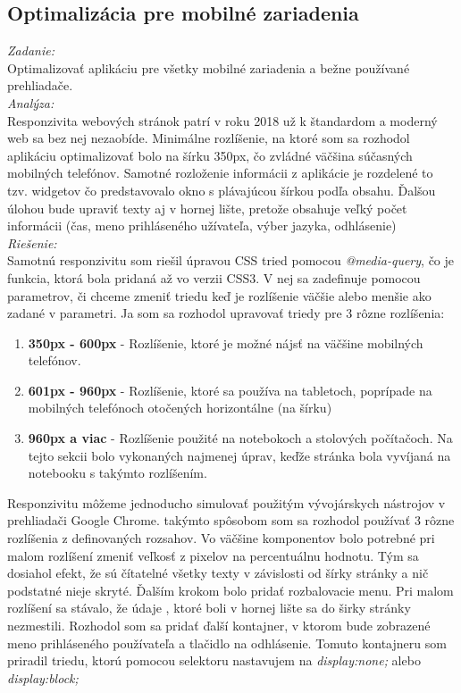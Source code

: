 \documentclass[11pt, oneside]{report}
\begin{document}
\subsection{Optimalizácia pre mobilné zariadenia}
\textit{Zadanie:}\\
Optimalizovať aplikáciu pre všetky mobilné zariadenia a bežne používané prehliadače.
\\\textit{Analýza:}\\
Responzivita webových stránok patrí v roku 2018 už k štandardom a moderný web sa bez nej nezaobíde. Minimálne rozlíšenie, na ktoré som sa rozhodol aplikáciu optimalizovať  bolo na šírku  350px, čo zvládné väčšina súčasných mobilných telefónov.  Samotné rozloženie  informácii z aplikácie je rozdelené to tzv. widgetov čo predstavovalo okno s plávajúcou šírkou podľa obsahu. Ďalšou úlohou bude upraviť  texty aj v hornej lište, pretože obsahuje veľký počet informácii (čas, meno prihláseného užívateľa, výber jazyka, odhlásenie)
\\\textit{Riešenie:}\\
Samotnú responzivitu som riešil  úpravou CSS tried pomocou \textit{@media-query}, čo je funkcia, ktorá bola pridaná až vo verzii CSS3. V nej sa zadefinuje pomocou parametrov, či chceme zmeniť triedu keď je rozlíšenie väčšie alebo menšie ako zadané v parametri. Ja som sa rozhodol upravovať triedy pre 3 rôzne rozlíšenia:
\begin{enumerate}
\item \textbf{350px - 600px} - Rozlíšenie, ktoré je možné nájsť na väčšine mobilných telefónov.
\item \textbf{601px - 960px} -  Rozlíšenie, ktoré sa používa na tabletoch, poprípade na mobilných telefónoch otočených horizontálne (na šírku)
\item \textbf{960px a viac} -  Rozlíšenie použité na notebokoch a stolových počítačoch. Na tejto sekcii bolo vykonaných najmenej úprav, keďže stránka bola vyvíjaná na notebooku s takýmto rozlíšením.
\end{enumerate}
Responzivitu môžeme jednoducho simulovať použitým vývojárskych nástrojov  v prehliadači Google Chrome. takýmto spôsobom som sa rozhodol používať 3 rôzne rozlíšenia z  definovaných rozsahov. Vo väčšine komponentov bolo potrebné pri malom rozlíšení zmeniť veľkosť z pixelov na percentuálnu hodnotu. Tým sa dosiahol efekt, že  sú čítatelné všetky texty v závislosti od šírky stránky a nič podstatné nieje skryté. Ďalším krokom bolo  pridať rozbalovacie menu. Pri malom rozlíšení sa stávalo, že údaje , ktoré boli v hornej lište  sa  do širky stránky nezmestili. Rozhodol som sa pridať ďalší kontajner, v ktorom bude zobrazené meno prihláseného používateľa a tlačidlo na odhlásenie. Tomuto kontajneru som priradil triedu, ktorú  pomocou selektoru nastavujem na \textit{display:none;} alebo \textit{display:block;}
\end{document}

